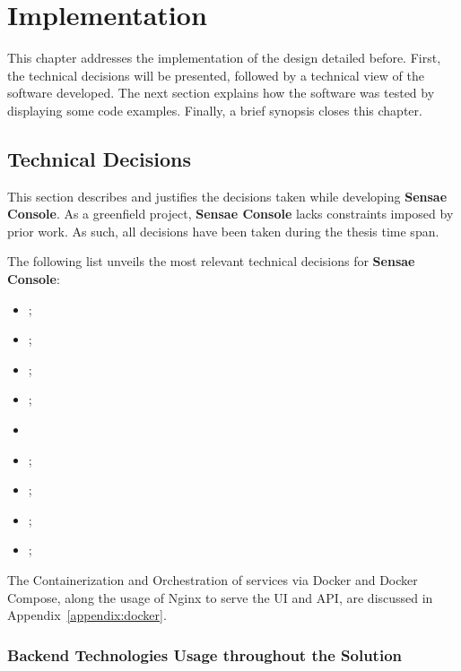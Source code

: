 \chapter{Implementation}
\label{chap:implementation}

This chapter addresses the implementation of the design detailed before. First, the technical decisions will be presented, followed by a technical view of the software developed. The next section explains how the software was tested by displaying some code examples. Finally, a brief synopsis closes this chapter.

\section{Technical Decisions}
\label{sec:implementation:decisions}

This section describes and justifies the decisions taken while developing \textbf{Sensae Console}.
As a greenfield project, \textbf{Sensae Console} lacks constraints imposed by prior work. As such, all decisions have been taken during the thesis time span.

The following list unveils the most relevant technical decisions for \textbf{Sensae Console}:

\begin{itemize}
    \item {};
    \item {};
    \item {};
    \item {};
    \item {}
    \item {};
    \item {};
    \item {};
    \item {};
\end{itemize}

The Containerization and Orchestration of services via Docker and Docker Compose, along the usage of Nginx to serve the \gls{UI} and \gls{API}, are discussed in Appendix~\ref{appendix:docker}.

\subsection{Backend Technologies Usage throughout the Solution}
\label{subsec:implementation:decisions:backend}

